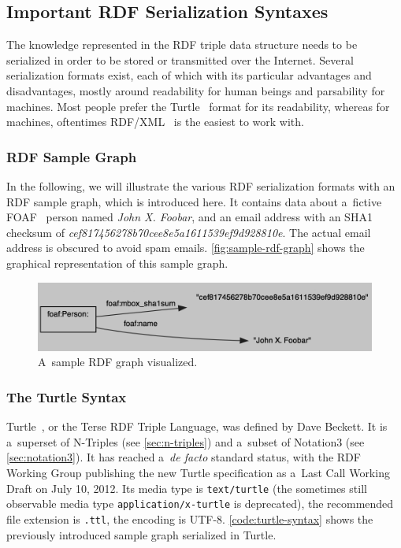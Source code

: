 \subsection{Important RDF Serialization Syntaxes}

The knowledge represented in the RDF triple data structure
needs to be serialized in order to be stored
or transmitted over the Internet.
Several serialization formats exist,
each of which with its particular advantages
and disadvantages, mostly around readability for human beings
and parsability for machines.
Most people prefer the Turtle~\cite{prudhommeaux2011turtle}
format for its readability,
whereas for machines, oftentimes RDF/XML~\cite{beckett2004rdfxml}
is the easiest to work with.

\subsubsection{RDF Sample Graph}
In the following, we will illustrate the various
RDF serialization formats
with an RDF sample graph, which is introduced here.
It contains data about a~fictive FOAF~\cite{brickley2010foaf}
person named \emph{John X. Foobar},
and an email address with an SHA1 checksum of
\emph{cef817456278b70cee8e5a1611539\-ef9d928810e}.
The actual email address is obscured to avoid spam emails.
\autoref{fig:sample-rdf-graph} shows the graphical representation
of this sample graph.

\begin{figure}[h!]
\begin{center}
  \includegraphics[width=\linewidth]{sample-rdf-graph.png} 
  \caption{A~sample RDF graph visualized.}
  \label{fig:sample-rdf-graph}
  \end{center}  
\end{figure}

\subsubsection{The Turtle Syntax} \label{sec:turtle}

Turtle~\cite{prudhommeaux2011turtle},
or the Terse RDF Triple Language, was defined by Dave Beckett.
It is a~superset of N-Triples (see \autoref{sec:n-triples}) and
a~subset of Notation3 (see \autoref{sec:notation3}).
It has reached a~\emph{de facto} standard status,
with the RDF Working Group publishing the new Turtle specification
as a~Last Call Working Draft on July 10, 2012.
Its media type is \texttt{text/turtle}
(the sometimes still observable media type
\texttt{application/x-turtle} is deprecated),
the recommended file extension is \texttt{.ttl},
the encoding is UTF-8.
\autoref{code:turtle-syntax} shows the previously
introduced sample graph serialized in Turtle.

